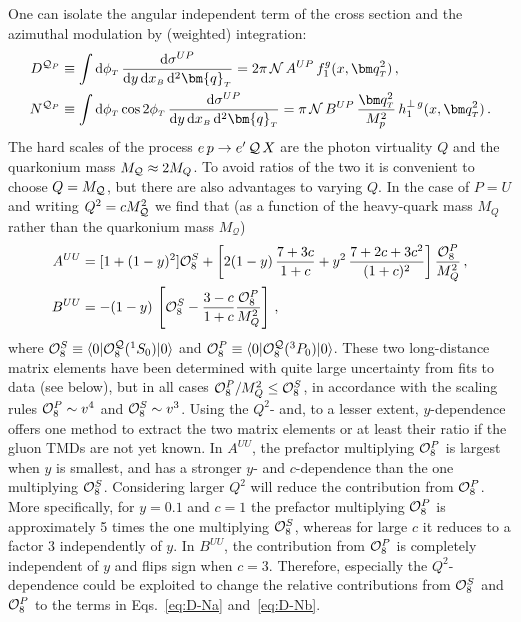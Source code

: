 \documentclass[prd,aps,preprintnumbers,nofootinbib,superscriptaddress]{revtex4}
\newcommand{\xB}{x_{\scriptscriptstyle B}}
\newcommand{\sT}{{\scriptscriptstyle T}}
\renewcommand{\d}{\mathrm{d}}
\begin{document}
One can isolate the angular independent term of the cross section and the azimuthal modulation by (weighted) integration:  
\begin{align}
D^{{\cal Q}_{P}}  & \equiv   \int \d \phi_\sT \,\frac{\d\sigma^{UP}}{\d y\,\d\xB\,\d^2 \bm{q}_{\sT} } =   2 \pi\, {\cal N}\, A^{UP}\,f_1^g(x, \bm q_\sT^2)\,, \label{eq:D-Na}\\
N^{{\cal Q}_{P}} & \equiv   \int \d \phi_\sT \cos 2\phi_\sT\,\frac{\d\sigma^{UP}}{\d y\,\d\xB\,\d^2 \bm{q}_{\sT} } =   \pi\, {\cal N}\, B^{UP}\, \frac{\bm q_\sT^2}{ M_p^2}\,h_1^{\perp\, g}(x, \bm q_\sT^2) \, .
\label{eq:D-Nb}
\end{align}
The hard scales of the process  $ e\,p \to e^\prime \,{\cal Q}\,X$ are the photon virtuality $Q$ and the quarkonium mass $M_{\cal Q}\approx 2 M_Q$. To avoid ratios of the two it is convenient to choose $Q=M_{\cal Q}$, but there are also advantages to varying $Q$. In the case of $P=U$ and writing $Q^2=cM_{\cal Q}^2$ we find that (as a function of the heavy-quark mass $M_Q$ rather than the quarkonium mass $M_\mathcal{Q}$)
\begin{align}
A^{UU} &= [1+(1-y)^2]{{\cal O}_{8}^S} + \left[2 (1-y)\, \frac{7+3c}{1+c} + y^2\, \frac{7+2c+3c^2}{(1+c)^2} \right] \frac{{\cal O}_{8}^P}{M_{Q}^{2}}  \,,\label{eq:AUU}\\
B^{UU} 
& = - (1-y)  \, \left [ {\cal O}_{8}^S - \frac{3-c}{1+c} \frac{{\cal O}_{8}^P}{M_Q^2} \right]\, ,
\label{eq:BUU}
\end{align}
where $ {\cal O}_{8}^S \equiv  \langle0\vert{\cal O}_{8}^{{\cal Q}}(^{1}S_{0})\vert0\rangle $  and $ {\cal O}_{8}^P \equiv  \langle0\vert{\cal O}_{8}^{{\cal Q}}(^{3}P_{0})\vert0\rangle $. These two long-distance matrix elements have been determined with quite large uncertainty from fits to data (see below), but in all cases ${\cal O}_{8}^P/M_Q^2 \leq {\cal O}_{8}^S$, in accordance with the scaling rules ${\cal O}_{8}^P \sim v^4$ and ${\cal O}_{8}^S\sim v^3$. Using the $Q^2$- and, to a lesser extent, $y$-dependence offers one method to extract the two matrix elements or at least their ratio if the gluon TMDs are not yet known. 
In $A^{UU}$, the prefactor multiplying ${\cal O}_{8}^P$ is largest when $y$ is smallest, and has a stronger $y$- and $c$-dependence than the one multiplying ${\cal O}_{8}^S$. Considering larger $Q^2$ will reduce the contribution from ${\cal O}_{8}^P$. More specifically, for $y=0.1$ and $c=1$ the prefactor multiplying ${\cal O}_{8}^P$ is approximately 5 times the one multiplying ${\cal O}_{8}^S$, whereas for large $c$ it reduces to a factor 3 independently of $y$. In $B^{UU}$,  the contribution from ${\cal O}_{8}^P$ is completely independent of $y$ and flips sign when $c=3$. Therefore, especially the $Q^2$-dependence could be exploited to change the relative contributions from ${\cal O}_{8}^S$ and ${\cal O}_{8}^P$ to the terms in Eqs.~\eqref{eq:D-Na} and~\eqref{eq:D-Nb}.
\end{document}
